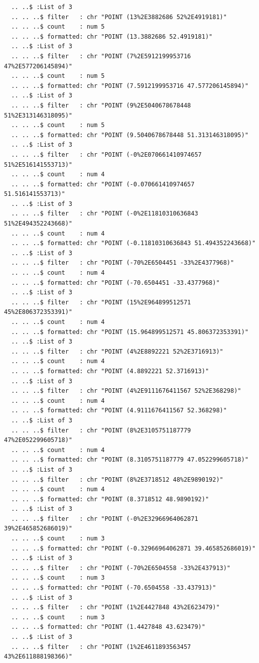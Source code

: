 \documentclass[
  letterpaper,
  DIV=11,
  numbers=noendperiod]{scrartcl}
\begin{document}
\begin{verbatim}
  .. ..$ :List of 3
  .. .. ..$ filter   : chr "POINT (13%2E3882686 52%2E4919181)"
  .. .. ..$ count    : num 5
  .. .. ..$ formatted: chr "POINT (13.3882686 52.4919181)"
  .. ..$ :List of 3
  .. .. ..$ filter   : chr "POINT (7%2E5912199953716 47%2E577206145894)"
  .. .. ..$ count    : num 5
  .. .. ..$ formatted: chr "POINT (7.5912199953716 47.577206145894)"
  .. ..$ :List of 3
  .. .. ..$ filter   : chr "POINT (9%2E5040678678448 51%2E313146318095)"
  .. .. ..$ count    : num 5
  .. .. ..$ formatted: chr "POINT (9.5040678678448 51.313146318095)"
  .. ..$ :List of 3
  .. .. ..$ filter   : chr "POINT (-0%2E070661410974657 51%2E516141553713)"
  .. .. ..$ count    : num 4
  .. .. ..$ formatted: chr "POINT (-0.070661410974657 51.516141553713)"
  .. ..$ :List of 3
  .. .. ..$ filter   : chr "POINT (-0%2E11810310636843 51%2E494352243668)"
  .. .. ..$ count    : num 4
  .. .. ..$ formatted: chr "POINT (-0.11810310636843 51.494352243668)"
  .. ..$ :List of 3
  .. .. ..$ filter   : chr "POINT (-70%2E6504451 -33%2E4377968)"
  .. .. ..$ count    : num 4
  .. .. ..$ formatted: chr "POINT (-70.6504451 -33.4377968)"
  .. ..$ :List of 3
  .. .. ..$ filter   : chr "POINT (15%2E964899512571 45%2E806372353391)"
  .. .. ..$ count    : num 4
  .. .. ..$ formatted: chr "POINT (15.964899512571 45.806372353391)"
  .. ..$ :List of 3
  .. .. ..$ filter   : chr "POINT (4%2E8892221 52%2E3716913)"
  .. .. ..$ count    : num 4
  .. .. ..$ formatted: chr "POINT (4.8892221 52.3716913)"
  .. ..$ :List of 3
  .. .. ..$ filter   : chr "POINT (4%2E9111676411567 52%2E368298)"
  .. .. ..$ count    : num 4
  .. .. ..$ formatted: chr "POINT (4.9111676411567 52.368298)"
  .. ..$ :List of 3
  .. .. ..$ filter   : chr "POINT (8%2E3105751187779 47%2E052299605718)"
  .. .. ..$ count    : num 4
  .. .. ..$ formatted: chr "POINT (8.3105751187779 47.052299605718)"
  .. ..$ :List of 3
  .. .. ..$ filter   : chr "POINT (8%2E3718512 48%2E9890192)"
  .. .. ..$ count    : num 4
  .. .. ..$ formatted: chr "POINT (8.3718512 48.9890192)"
  .. ..$ :List of 3
  .. .. ..$ filter   : chr "POINT (-0%2E32966964062871 39%2E465852686019)"
  .. .. ..$ count    : num 3
  .. .. ..$ formatted: chr "POINT (-0.32966964062871 39.465852686019)"
  .. ..$ :List of 3
  .. .. ..$ filter   : chr "POINT (-70%2E6504558 -33%2E437913)"
  .. .. ..$ count    : num 3
  .. .. ..$ formatted: chr "POINT (-70.6504558 -33.437913)"
  .. ..$ :List of 3
  .. .. ..$ filter   : chr "POINT (1%2E4427848 43%2E623479)"
  .. .. ..$ count    : num 3
  .. .. ..$ formatted: chr "POINT (1.4427848 43.623479)"
  .. ..$ :List of 3
  .. .. ..$ filter   : chr "POINT (1%2E4611893563457 43%2E611888198366)"

\end{verbatim}
\end{document}
